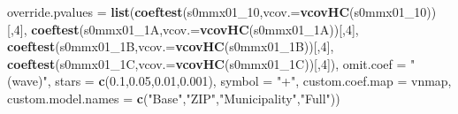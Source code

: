 \documentclass[
]{article}
\newenvironment{Shaded}{\begin{snugshade}}{\end{snugshade}}
\newcommand{\DataTypeTok}[1]{\textcolor[rgb]{0.13,0.29,0.53}{#1}}
\newcommand{\DecValTok}[1]{\textcolor[rgb]{0.00,0.00,0.81}{#1}}
\newcommand{\FloatTok}[1]{\textcolor[rgb]{0.00,0.00,0.81}{#1}}
\newcommand{\KeywordTok}[1]{\textcolor[rgb]{0.13,0.29,0.53}{\textbf{#1}}}
\newcommand{\NormalTok}[1]{#1}
\newcommand{\StringTok}[1]{\textcolor[rgb]{0.31,0.60,0.02}{#1}}
\begin{document}
\begin{Shaded}
\begin{Highlighting}[]
          \DataTypeTok{override.pvalues =} \KeywordTok{list}\NormalTok{(}\KeywordTok{coeftest}\NormalTok{(s0mmx01_}\DecValTok{10}\NormalTok{,}\DataTypeTok{vcov.=}\KeywordTok{vcovHC}\NormalTok{(s0mmx01_}\DecValTok{10}\NormalTok{))[,}\DecValTok{4}\NormalTok{],}
                                  \KeywordTok{coeftest}\NormalTok{(s0mmx01_1A,}\DataTypeTok{vcov.=}\KeywordTok{vcovHC}\NormalTok{(s0mmx01_1A))[,}\DecValTok{4}\NormalTok{],}
                                  \KeywordTok{coeftest}\NormalTok{(s0mmx01_1B,}\DataTypeTok{vcov.=}\KeywordTok{vcovHC}\NormalTok{(s0mmx01_1B))[,}\DecValTok{4}\NormalTok{],}
                                  \KeywordTok{coeftest}\NormalTok{(s0mmx01_1C,}\DataTypeTok{vcov.=}\KeywordTok{vcovHC}\NormalTok{(s0mmx01_1C))[,}\DecValTok{4}\NormalTok{]),}
          \DataTypeTok{omit.coef =} \StringTok{"(wave)"}\NormalTok{, }\DataTypeTok{stars =} \KeywordTok{c}\NormalTok{(}\FloatTok{0.1}\NormalTok{,}\FloatTok{0.05}\NormalTok{,}\FloatTok{0.01}\NormalTok{,}\FloatTok{0.001}\NormalTok{), }\DataTypeTok{symbol =} \StringTok{"+"}\NormalTok{,}
          \DataTypeTok{custom.coef.map =}\NormalTok{ vnmap, }
          \DataTypeTok{custom.model.names =} \KeywordTok{c}\NormalTok{(}\StringTok{"Base"}\NormalTok{,}\StringTok{"ZIP"}\NormalTok{,}\StringTok{"Municipality"}\NormalTok{,}\StringTok{"Full"}\NormalTok{))}
\end{Highlighting}
\end{Shaded}
\end{document}
